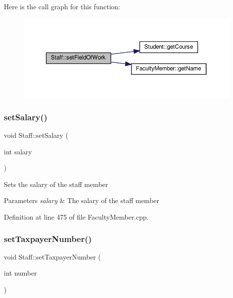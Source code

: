 Here is the call graph for this function\+:\nopagebreak
\begin{figure}[H]
\begin{center}
\leavevmode
\includegraphics[width=350pt]{classStaff_a3522c4036c9fcc08d2cd2ad4032ef507_cgraph}
\end{center}
\end{figure}
\mbox{\label{classStaff_a70d472e604f726f11bd01bfe325b8216}} 
\subsubsection{\texorpdfstring{set\+Salary()}{setSalary()}}
{\footnotesize\ttfamily void Staff\+::set\+Salary (\begin{DoxyParamCaption}\item[{int}]{salary }\end{DoxyParamCaption})}

Sets the salary of the staff member 
\begin{DoxyParams}{Parameters}
{\em salary} & The salary of the staff member \\
\hline
\end{DoxyParams}


Definition at line 475 of file Faculty\+Member.\+cpp.

\mbox{\label{classStaff_a383d6f3eeebdbf7fd7ff86f4e43bde99}} 
\subsubsection{\texorpdfstring{set\+Taxpayer\+Number()}{setTaxpayerNumber()}}
{\footnotesize\ttfamily void Staff\+::set\+Taxpayer\+Number (\begin{DoxyParamCaption}\item[{int}]{number }\end{DoxyParamCaption})}

